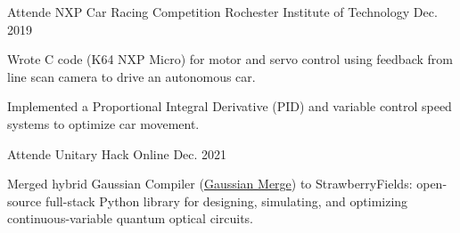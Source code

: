 

\begin{cventries}

  \cventry
    {Attende} %
    {NXP Car Racing Competition} %
    {Rochester Institute of Technology} %
    {Dec. 2019} %
    {
      \begin{cvitems} %
        \item {Wrote C code (K64 NXP Micro) for motor and servo control using feedback from line scan camera to drive an autonomous car.}
        \item {Implemented a Proportional Integral Derivative (PID) and variable control speed systems to optimize car movement.}
      \end{cvitems}
    }

  \cventry
    {Attende} %
    {Unitary Hack} %
    {Online} %
    {Dec. 2021} %
    {
      \begin{cvitems} %
        \item {Merged hybrid Gaussian Compiler (\href{https://github.com/XanaduAI/strawberryfields/pull/591}{Gaussian Merge}) to StrawberryFields: open-source full-stack Python library for designing, simulating, and optimizing continuous-variable quantum optical circuits.}
      \end{cvitems}
    }


\end{cventries}
